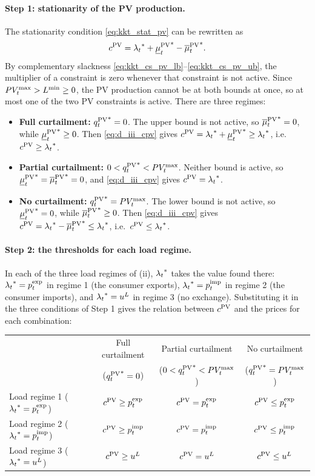 \paragraph{Step 1: stationarity of the PV production.}
The stationarity condition \eqref{eq:kkt_stat_pv} can be rewritten as
\begin{equation}
    c^{\mathrm{PV}} = {\lambda_{t}}^* + {\underline{\mu}^{\mathrm{PV}}_{t}}^* - {\overline{\mu}^{\mathrm{PV}}_{t}}^*.
    \label{eq:d_iii_cpv}
\end{equation}
By complementary slackness \eqref{eq:kkt_cs_pv_lb}--\eqref{eq:kkt_cs_pv_ub}, the multiplier of
a constraint is zero whenever that constraint is not active. Since $PV_{t}^{\max} > L^{\min} \geq 0$,
the PV production cannot be at both bounds at once, so at most one of the two PV constraints
is active. There are three regimes:
\begin{itemize}
    \item \textbf{Full curtailment:} ${q^{\mathrm{PV}}_{t}}^* = 0$. The upper bound is not active, so
    ${\overline{\mu}^{\mathrm{PV}}_{t}}^* = 0$, while ${\underline{\mu}^{\mathrm{PV}}_{t}}^* \geq 0$. Then \eqref{eq:d_iii_cpv} gives
    $c^{\mathrm{PV}} = {\lambda_{t}}^* + {\underline{\mu}^{\mathrm{PV}}_{t}}^* \geq {\lambda_{t}}^*$, i.e.\ $c^{\mathrm{PV}} \geq {\lambda_{t}}^*$.
    \item \textbf{Partial curtailment:} $0 < {q^{\mathrm{PV}}_{t}}^* < PV_{t}^{\max}$. Neither bound is active,
    so ${\underline{\mu}^{\mathrm{PV}}_{t}}^* = {\overline{\mu}^{\mathrm{PV}}_{t}}^* = 0$, and \eqref{eq:d_iii_cpv} gives $c^{\mathrm{PV}} = {\lambda_{t}}^*$.
    \item \textbf{No curtailment:} ${q^{\mathrm{PV}}_{t}}^* = PV_{t}^{\max}$. The lower bound is not active, so
    ${\underline{\mu}^{\mathrm{PV}}_{t}}^* = 0$, while ${\overline{\mu}^{\mathrm{PV}}_{t}}^* \geq 0$. Then \eqref{eq:d_iii_cpv} gives
    $c^{\mathrm{PV}} = {\lambda_{t}}^* - {\overline{\mu}^{\mathrm{PV}}_{t}}^* \leq {\lambda_{t}}^*$, i.e.\ $c^{\mathrm{PV}} \leq {\lambda_{t}}^*$.
\end{itemize}

\paragraph{Step 2: the thresholds for each load regime.}
In each of the three load regimes of (ii), ${\lambda_{t}}^*$ takes the value found there:
${\lambda_{t}}^* = p^{\mathrm{exp}}_{t}$ in regime 1 (the consumer exports), ${\lambda_{t}}^* = p^{\mathrm{imp}}_{t}$ in regime 2 (the
consumer imports), and ${\lambda_{t}}^* = u^{L}$ in regime 3 (no exchange). Substituting it in the three
conditions of Step 1 gives the relation between $c^{\mathrm{PV}}$ and the prices for each combination:
\begin{center}
\begin{tabular}{lccc}
    \toprule
    & Full curtailment & Partial curtailment & No curtailment \\
    & (${q^{\mathrm{PV}}_{t}}^* = 0$) & ($0 < {q^{\mathrm{PV}}_{t}}^* < PV_{t}^{\max}$) & (${q^{\mathrm{PV}}_{t}}^* = PV_{t}^{\max}$) \\
    \midrule
    Load regime 1 (${\lambda_{t}}^* = p^{\mathrm{exp}}_{t}$) & $c^{\mathrm{PV}} \geq p^{\mathrm{exp}}_{t}$ & $c^{\mathrm{PV}} = p^{\mathrm{exp}}_{t}$ & $c^{\mathrm{PV}} \leq p^{\mathrm{exp}}_{t}$ \\
    Load regime 2 (${\lambda_{t}}^* = p^{\mathrm{imp}}_{t}$) & $c^{\mathrm{PV}} \geq p^{\mathrm{imp}}_{t}$ & $c^{\mathrm{PV}} = p^{\mathrm{imp}}_{t}$ & $c^{\mathrm{PV}} \leq p^{\mathrm{imp}}_{t}$ \\
    Load regime 3 (${\lambda_{t}}^* = u^{L}$) & $c^{\mathrm{PV}} \geq u^{L}$ & $c^{\mathrm{PV}} = u^{L}$ & $c^{\mathrm{PV}} \leq u^{L}$ \\
    \bottomrule
\end{tabular}
\end{center}

